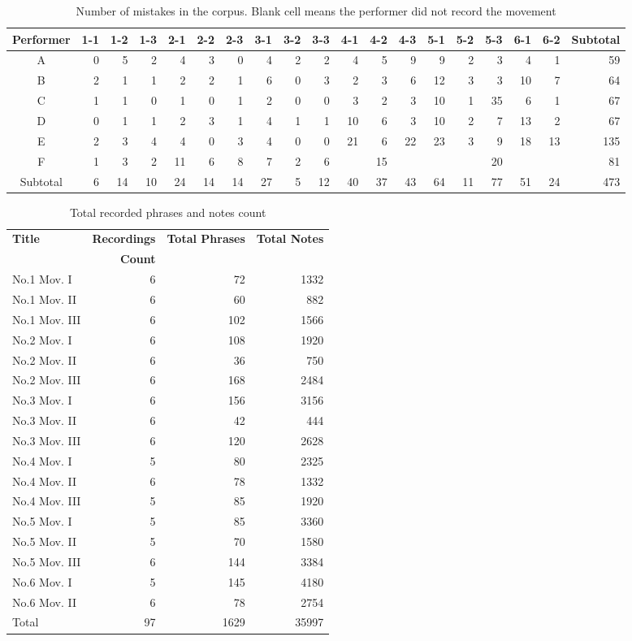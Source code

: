 \begin{table}
   \centering
   \caption{Number of mistakes in the corpus. Blank cell means the performer did not record the movement}
   \label{tab:mistakes}
   \begin{tabular}{c|rrrrrrrrrrrrrrrrr|r}
      \hline
      Performer&1-1&1-2&1-3&2-1&2-2&2-3&3-1&3-2&3-3&4-1&4-2&4-3&5-1&5-2&5-3&6-1&6-2&Subtotal\\
      \hline
      A&0&5&2&4&3&0&4&2&2&4&5&9&9&2&3&4&1&59\\
      B&2&1&1&2&2&1&6&0&3&2&3&6&12&3&3&10&7&64\\
      C&1&1&0&1&0&1&2&0&0&3&2&3&10&1&35&6&1&67\\
      D&0&1&1&2&3&1&4&1&1&10&6&3&10&2&7&13&2&67\\
      E&2&3&4&4&0&3&4&0&0&21&6&22&23&3&9&18&13&135\\
      F&1&3&2&11&6&8&7&2&6&&15&&&&20&&&81\\
      \hline
      Subtotal&6&14&10&24&14&14&27&5&12&40&37&43&64&11&77&51&24&473\\
   \end{tabular}
\end{table}
\begin{table}[bp]
   \centering
   \caption{Total recorded phrases and notes count}
   \label{tab:corpuscount}
   \begin{tabular}{l|rrr}
      \hline
      \bf Title&\bf Recordings&\bf Total Phrases&\bf Total Notes\\
      &\bf Count&&\\
      \hline
      No.1 Mov. I&6&72&1332\\
      No.1 Mov. II&6&60&882\\
      No.1 Mov. III&6&102&1566\\
      No.2 Mov. I&6&108&1920\\
      No.2 Mov. II&6&36&750\\
      No.2 Mov. III&6&168&2484\\
      No.3 Mov. I&6&156&3156\\
      No.3 Mov. II&6&42&444\\
      No.3 Mov. III&6&120&2628\\
      No.4 Mov. I&5&80&2325\\
      No.4 Mov. II&6&78&1332\\
      No.4 Mov. III&5&85&1920\\
      No.5 Mov. I&5&85&3360\\
      No.5 Mov. II&5&70&1580\\
      No.5 Mov. III&6&144&3384\\
      No.6 Mov. I&5&145&4180\\
      No.6 Mov. II&6&78&2754\\
      \hline
      Total&97&1629&35997\\
      \hline
   \end{tabular}
\end{table}

